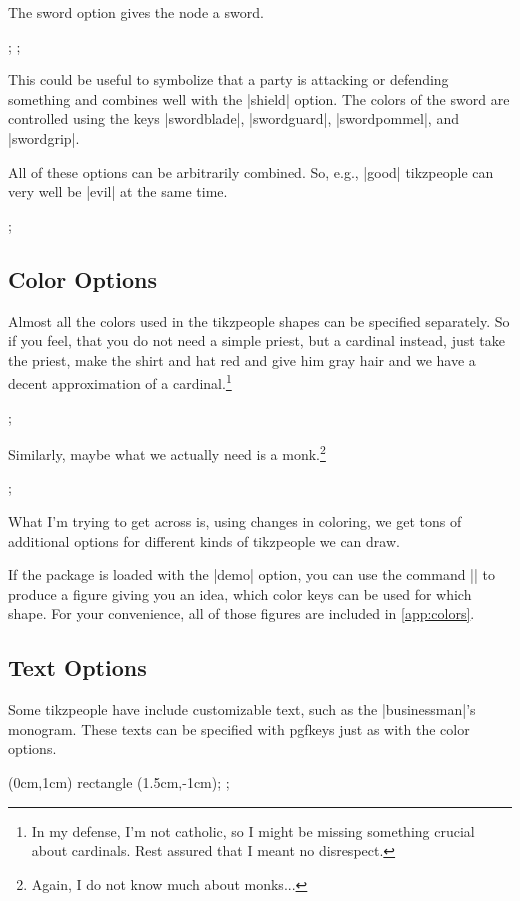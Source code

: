 \documentclass{ltxdoc}
\newcommand{\DescribeOption}[1]{\leavevmode
	\marginpar{\raggedleft\strut\MacroFont\string #1\ }}
\begin{document}
	\DescribeOption{sword} The \textsf{sword} option gives the node a sword.
		\begin{codeexample}{4cm}
\node[dave,minimum size=1cm,xshift=-1.2cm]{};
\node[dave,sword,minimum size=1cm]{};
		\end{codeexample}
		This could be useful to symbolize that a party is attacking or defending something and combines well with the |shield| option.
		The colors of the sword are controlled using the keys |swordblade|, |swordguard|, |swordpommel|, and |swordgrip|.

	All of these options can be arbitrarily combined. So, e.g., |good| \textsf{tikzpeople} can very well be |evil| at the same time.
	\begin{codeexample}{4cm}
\node[chef,evil,female,good,mirrored,monitor,
  saturated,shield,sword,minimum size=1.5cm]{};
	\end{codeexample}
\subsection{Color Options}
	Almost all the colors used in the \textsf{tikzpeople} shapes can be specified separately.
	So if you feel, that you do not need a simple priest, but a cardinal instead, just take the priest, make the shirt and hat red and give him gray hair and we have a decent approximation of a cardinal.\footnote{In my defense, I'm not catholic, so I might be missing something crucial about cardinals. Rest assured that I meant no disrespect.}
	\begin{codeexample}{3cm}
\node[priest, shirt=red, hat=red, hair=gray, minimum size=1.5cm]{};
	\end{codeexample}
	Similarly, maybe what we actually need is a monk.\footnote{Again, I do not know much about monks...}
	\begin{codeexample}{3cm}
\node[priest,shirt=brown, hat=skin, cross=gray, collar=brown, minimum size=1.5cm]{};
	\end{codeexample}
	What I'm trying to get across is, using changes in coloring, we get tons of additional options for different kinds of \textsf{tikzpeople} we can draw.
	
	\DescribeMacro{\tikzpeoplecolors} If the package is loaded with the |demo| option, you can use the command |\tikzpeoplecolors| to produce a figure giving you an idea, which color keys can be used for which shape.
	For your convenience, all of those figures are included in \autoref{app:colors}.
	
	\subsection{Text Options}
	Some \textsf{tikzpeople} have include customizable text, such as the |businessman|'s monogram.
	These texts can be specified with pgfkeys just as with the color options.
	\vspace{.75em}
	\begin{codeexample}{3cm}
\path [clip] (0cm,1cm) rectangle (1.5cm,-1cm);
\node[businessman, monogramtext=ER ,minimum size=5cm]{};
	\end{codeexample}
	
\end{document}
